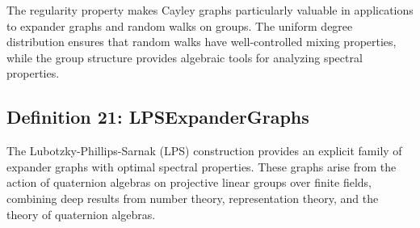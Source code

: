 \documentclass[11pt]{article}
\theoremstyle{plain}
\theoremstyle{definition}
\theoremstyle{remark}
\begin{document}
The regularity property makes Cayley graphs particularly valuable in applications to expander graphs and random walks on groups. The uniform degree distribution ensures that random walks have well-controlled mixing properties, while the group structure provides algebraic tools for analyzing spectral properties.

\vspace{1em}

\subsection{Definition 21: LPSExpanderGraphs}

The Lubotzky-Phillips-Sarnak (LPS) construction provides an explicit family of expander graphs with optimal spectral properties. These graphs arise from the action of quaternion algebras on projective linear groups over finite fields, combining deep results from number theory, representation theory, and the theory of quaternion algebras.
\end{document}
